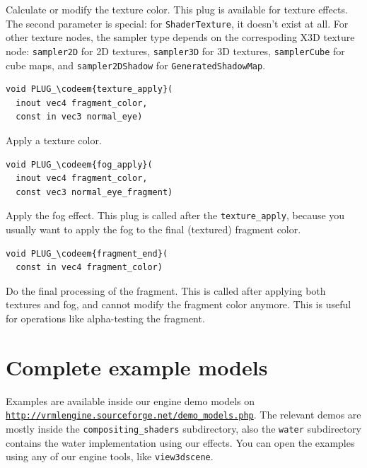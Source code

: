 \documentclass{acmsiggraph}                     %
\newcommand*{\codeem}[1]{\textbf{#1}}
\newcommand*{\myhref}[2]{\texttt{\href{#1}{\nolinkurl{#2}}}}
\begin{document}
Calculate or modify the texture color.
This plug is available for texture effects. The second parameter
is special: for \texttt{ShaderTexture}, it doesn't exist at all.
For other texture nodes, the sampler type depends on the correspoding
X3D texture node: \texttt{sampler2D} for 2D textures,
\texttt{sampler3D} for 3D textures, \texttt{samplerCube} for cube
maps, and \texttt{sampler2DShadow} for \texttt{GeneratedShadowMap}.

\begin{Verbatim}[commandchars=\\\{\},frame=single]
void PLUG_\codeem{texture_apply}(
  inout vec4 fragment_color,
  const in vec3 normal_eye)
\end{Verbatim}

Apply a texture color.

\begin{Verbatim}[commandchars=\\\{\},frame=single]
void PLUG_\codeem{fog_apply}(
  inout vec4 fragment_color,
  const vec3 normal_eye_fragment)
\end{Verbatim}

Apply the fog effect. This plug is called after
the \texttt{texture\_apply}, because you usually want to apply the fog
to the final (textured) fragment color.

\begin{Verbatim}[commandchars=\\\{\},frame=single]
void PLUG_\codeem{fragment_end}(
  const in vec4 fragment_color)
\end{Verbatim}

Do the final processing of the fragment. This is called after applying
both textures and fog, and cannot modify the fragment color anymore.
This is useful for operations like alpha-testing the fragment.

\section{Complete example models}

Examples are available inside our engine demo models on
\myhref{http://vrmlengine.sourceforge.net/demo\_models.php}{http://vrmlengine.sourceforge.net/demo_models.php}.
The relevant demos are mostly inside the \texttt{compositing\_shaders}
subdirectory, also the \texttt{water} subdirectory contains
the water implementation using our effects.
You can open the examples using any of our engine tools,
like \texttt{view3dscene}.
\end{document}
